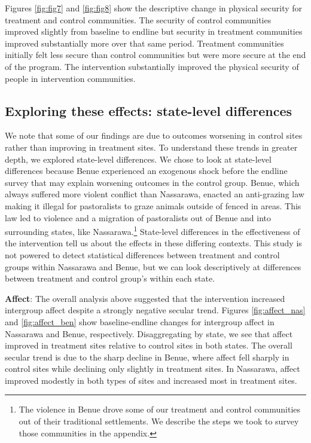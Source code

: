 \documentclass[11pt]{article}
\begin{document}
Figures \ref{fig:fig7} and \ref{fig:fig8} show the descriptive change in
physical security for treatment and control communities. The security of
control communities improved slightly from baseline to endline but
security in treatment communities improved substantially more over that
same period. Treatment communities initially felt less secure than
control communities but were more secure at the end of the program. The
intervention substantially improved the physical security of people in
intervention communities.

\hypertarget{exploring-these-effects-state-level-differences}{%
\subsection{Exploring these effects: state-level
differences}\label{exploring-these-effects-state-level-differences}}

We note that some of our findings are due to outcomes worsening in
control sites rather than improving in treatment sites. To understand
these trends in greater depth, we explored state-level differences. We
chose to look at state-level differences because Benue experienced an
exogenous shock before the endline survey that may explain worsening
outcomes in the control group. Benue, which always suffered more violent
conflict than Nassarawa, enacted an anti-grazing law making it illegal
for pastoralists to graze animals outside of fenced in areas. This law
led to violence and a migration of pastoralists out of Benue and into
surrounding states, like Nassarawa.\footnote{The violence in Benue drove
  some of our treatment and control communities out of their traditional
  settlements. We describe the steps we took to survey those communities
  in the appendix.} State-level differences in the effectiveness of the
intervention tell us about the effects in these differing contexts. This
study is not powered to detect statistical differences between treatment
and control groups within Nassarawa and Benue, but we can look
descriptively at differences between treatment and control group's
within each state.

\textbf{Affect}: The overall analysis above suggested that the
intervention increased intergroup affect despite a strongly negative
secular trend. Figures \ref{fig:affect_nas} and \ref{fig:affect_ben}
show baseline-endline changes for intergroup affect in Nassarawa and
Benue, respectively. Disaggregating by state, we see that affect
improved in treatment sites relative to control sites in both states.
The overall secular trend is due to the sharp decline in Benue, where
affect fell sharply in control sites while declining only slightly in
treatment sites. In Nassarawa, affect improved modestly in both types of
sites and increased most in treatment sites.
\end{document}
